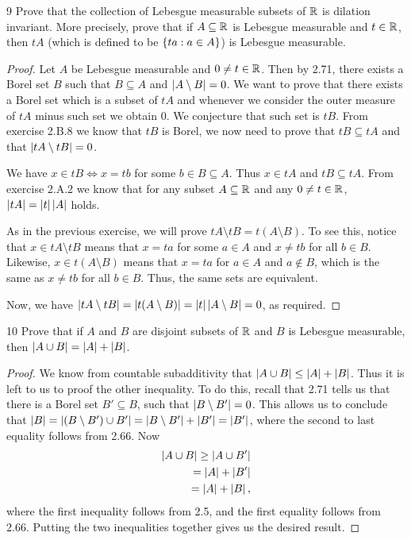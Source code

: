 \begin{exercise}{9}
Prove that the collection of Lebesgue measurable subsets of $\mathbb{R}$ is dilation invariant.
More precisely, prove that if $A\subseteq\mathbb{R}$ is Lebesgue measurable and $t\in\mathbb{R}$, then $tA$ (which is defined to be $\{ta: a\in A\}$) is Lebesgue measurable.
\end{exercise}
\begin{proof}
Let $A$ be Lebesgue measurable and $0\neq t\in\mathbb{R}$.
Then by 2.71, there exists a Borel set $B$ such that $B \subseteq A$ and $\left\lvert A \setminus B\right\rvert = 0$.
We want to prove that there exists a Borel set which is a subset of $tA$ and whenever we consider the outer measure of $tA$ minus such set we obtain 0.
We conjecture that such set is $tB$.
From exercise 2.B.8 we know that $tB$ is Borel, we now need to prove that $tB \subseteq tA$ and that $\left\lvert tA \setminus tB\right\rvert = 0$.

We have $x \in tB \iff x = tb$ for some $b\in B\subseteq A$.
Thus $x\in tA$ and $tB \subseteq tA$.
From exercise 2.A.2 we know that for any subset $A\subseteq\mathbb{R}$ and any $0\neq t \in \mathbb{R}$, $\left\lvert tA\right\rvert = \left\lvert t\right\rvert\left\lvert A\right\rvert$ holds.

As in the previous exercise, we will prove $tA \setminus tB = t(A \setminus B)$.
To see this, notice that $x \in tA \setminus tB$ means that $x = ta$ for some $a \in A$ and $x \neq tb$ for all $b \in B$.
Likewise, $x \in t(A \setminus B)$ means that $x = ta$ for $a \in A$ and $a \notin B$, which is the same as $x \neq tb$ for all $b \in B$.
Thus, the same sets are equivalent.

Now, we have $\left\lvert tA \setminus tB\right\rvert = \left\lvert t(A \setminus B)\right\rvert = \left\lvert t\right\rvert\left\lvert A \setminus B\right\rvert = 0$, as required.
\end{proof} 

\begin{exercise}{10}
Prove that if $A$ and $B$ are disjoint subsets of $\mathbb{R}$ and $B$ is Lebesgue measurable, then $\left\lvert A \cup B\right\rvert = \left\lvert A\right\rvert + \left\lvert B\right\rvert$.
\end{exercise}
\begin{proof}
We know from countable subadditivity that $\left\lvert A \cup B\right\rvert \leq \left\lvert A\right\rvert + \left\lvert B\right\rvert$.
Thus it is left to us to proof the other inequality.
To do this, recall that 2.71 tells us that there is a Borel set $B' \subseteq B$, such that $\left\lvert B \setminus B'\right\rvert = 0$.
This allows us to conclude that $\left\lvert B\right\rvert = \left\lvert (B \setminus B') \cup B'\right\rvert = \left\lvert B \setminus B'\right\rvert + \left\lvert B'\right\rvert = \left\lvert B'\right\rvert$, where the second to last equality follows from 2.66.
Now
\begin{align*}
    \left\lvert A \cup B\right\rvert
    \geq \left\lvert A \cup B'\right\rvert\\
    = \left\lvert A\right\rvert + \left\lvert B'\right\rvert\\
    = \left\lvert A\right\rvert + \left\lvert B\right\rvert,
\end{align*}
where the first inequality follows from 2.5, and the first equality follows from 2.66.
Putting the two inequalities together gives us the desired result.
\end{proof} 


